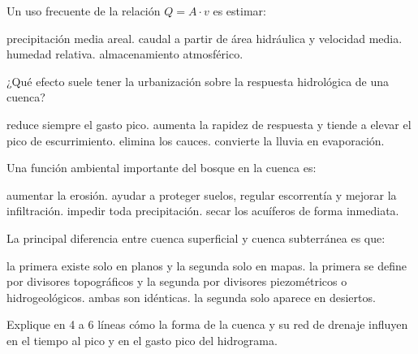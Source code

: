 \begin{questions}
\question[3] Un uso frecuente de la relación $Q = A \cdot v$ es estimar:
\begin{choices}
  \choice precipitación media areal.
  \CorrectChoice caudal a partir de área hidráulica y velocidad media.
  \choice humedad relativa.
  \choice almacenamiento atmosférico.
\end{choices}

\question[3] ¿Qué efecto suele tener la urbanización sobre la respuesta
hidrológica de una cuenca?
\begin{choices}
  \choice reduce siempre el gasto pico.
  \CorrectChoice aumenta la rapidez de respuesta y tiende a elevar el pico de escurrimiento.
  \choice elimina los cauces.
  \choice convierte la lluvia en evaporación.
\end{choices}

\question[3] Una función ambiental importante del bosque en la cuenca es:
\begin{choices}
  \choice aumentar la erosión.
  \CorrectChoice ayudar a proteger suelos, regular escorrentía y mejorar la infiltración.
  \choice impedir toda precipitación.
  \choice secar los acuíferos de forma inmediata.
\end{choices}

\question[3] La principal diferencia entre cuenca superficial y cuenca
subterránea es que:
\begin{choices}
  \choice la primera existe solo en planos y la segunda solo en mapas.
  \CorrectChoice la primera se define por divisores topográficos y la segunda por divisores piezométricos o hidrogeológicos.
  \choice ambas son idénticas.
  \choice la segunda solo aparece en desiertos.
\end{choices}

\question[8] Explique en 4 a 6 líneas cómo la forma de la cuenca y su red
de drenaje influyen en el tiempo al pico y en el gasto pico del
hidrograma.

\vspace{3cm}

\end{questions}



